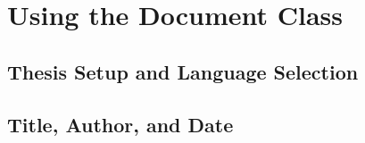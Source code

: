 \chapter{Using the Document Class}
\label{chap:usage}

\section{Thesis Setup and Language Selection}
\label{sec:setup}



\section{Title, Author, and Date}



